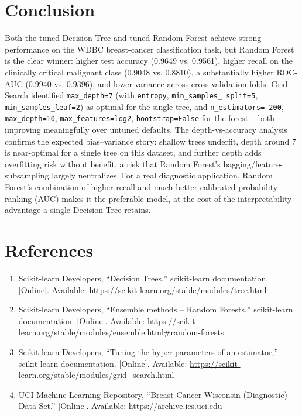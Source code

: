 \documentclass[12pt,a4paper]{article}
\begin{document}
\section{Conclusion}
Both the tuned Decision Tree and tuned Random Forest achieve strong performance on the WDBC
breast-cancer classification task, but Random Forest is the clear winner: higher test accuracy
(0.9649 vs. 0.9561), higher recall on the clinically critical malignant class (0.9048 vs. 0.8810),
a substantially higher ROC-AUC (0.9940 vs. 0.9396), and lower variance across cross-validation
folds. Grid Search identified \texttt{max\_depth=7} (with \texttt{entropy}, \texttt{min\_samples\_
split=5}, \texttt{min\_samples\_leaf=2}) as optimal for the single tree, and \texttt{n\_estimators=
200}, \texttt{max\_depth=10}, \texttt{max\_features=log2}, \texttt{bootstrap=False} for the
forest -- both improving meaningfully over untuned defaults. The depth-vs-accuracy analysis
confirms the expected bias--variance story: shallow trees underfit, depth around 7 is near-optimal
for a single tree on this dataset, and further depth adds overfitting risk without benefit, a
risk that Random Forest's bagging/feature-subsampling largely neutralizes. For a real diagnostic
application, Random Forest's combination of higher recall and much better-calibrated probability
ranking (AUC) makes it the preferable model, at the cost of the interpretability advantage a
single Decision Tree retains.

\section{References}
\begin{enumerate}
\item Scikit-learn Developers, ``Decision Trees,'' scikit-learn documentation. [Online].
Available: \url{https://scikit-learn.org/stable/modules/tree.html}
\item Scikit-learn Developers, ``Ensemble methods -- Random Forests,'' scikit-learn
documentation. [Online]. Available:
\url{https://scikit-learn.org/stable/modules/ensemble.html#random-forests}
\item Scikit-learn Developers, ``Tuning the hyper-parameters of an estimator,'' scikit-learn
documentation. [Online]. Available:
\url{https://scikit-learn.org/stable/modules/grid_search.html}
\item UCI Machine Learning Repository, ``Breast Cancer Wisconsin (Diagnostic) Data Set.''
[Online]. Available: \url{https://archive.ics.uci.edu}
\end{enumerate}
\end{document}
